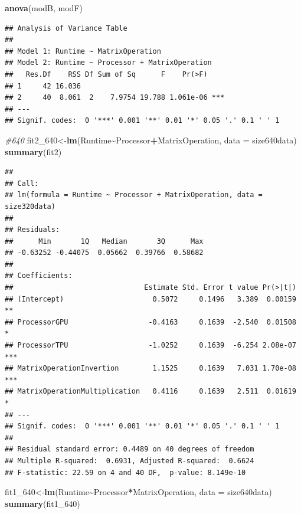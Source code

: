 \documentclass[
]{article}
\newenvironment{Shaded}{\begin{snugshade}}{\end{snugshade}}
\newcommand{\CommentTok}[1]{\textcolor[rgb]{0.56,0.35,0.01}{\textit{#1}}}
\newcommand{\DataTypeTok}[1]{\textcolor[rgb]{0.13,0.29,0.53}{#1}}
\newcommand{\DecValTok}[1]{\textcolor[rgb]{0.00,0.00,0.81}{#1}}
\newcommand{\KeywordTok}[1]{\textcolor[rgb]{0.13,0.29,0.53}{\textbf{#1}}}
\newcommand{\NormalTok}[1]{#1}
\newcommand{\OperatorTok}[1]{\textcolor[rgb]{0.81,0.36,0.00}{\textbf{#1}}}
\begin{document}
\begin{Shaded}
\begin{Highlighting}[]
\KeywordTok{anova}\NormalTok{(modB, modF)}
\end{Highlighting}
\end{Shaded}

\begin{verbatim}
## Analysis of Variance Table
## 
## Model 1: Runtime ~ MatrixOperation
## Model 2: Runtime ~ Processor + MatrixOperation
##   Res.Df    RSS Df Sum of Sq      F    Pr(>F)    
## 1     42 16.036                                  
## 2     40  8.061  2    7.9754 19.788 1.061e-06 ***
## ---
## Signif. codes:  0 '***' 0.001 '**' 0.01 '*' 0.05 '.' 0.1 ' ' 1
\end{verbatim}

\begin{Shaded}
\begin{Highlighting}[]
\CommentTok{\#640}
\NormalTok{fit2\_}\DecValTok{640}\NormalTok{\textless{}{-}}\KeywordTok{lm}\NormalTok{(Runtime}\OperatorTok{\textasciitilde{}}\NormalTok{Processor}\OperatorTok{+}\NormalTok{MatrixOperation, }\DataTypeTok{data =}\NormalTok{ size640data)}
\KeywordTok{summary}\NormalTok{(fit2)}
\end{Highlighting}
\end{Shaded}

\begin{verbatim}
## 
## Call:
## lm(formula = Runtime ~ Processor + MatrixOperation, data = size320data)
## 
## Residuals:
##      Min       1Q   Median       3Q      Max 
## -0.63252 -0.44075  0.05662  0.39766  0.58682 
## 
## Coefficients:
##                               Estimate Std. Error t value Pr(>|t|)    
## (Intercept)                     0.5072     0.1496   3.389  0.00159 ** 
## ProcessorGPU                   -0.4163     0.1639  -2.540  0.01508 *  
## ProcessorTPU                   -1.0252     0.1639  -6.254 2.08e-07 ***
## MatrixOperationInvertion        1.1525     0.1639   7.031 1.70e-08 ***
## MatrixOperationMultiplication   0.4116     0.1639   2.511  0.01619 *  
## ---
## Signif. codes:  0 '***' 0.001 '**' 0.01 '*' 0.05 '.' 0.1 ' ' 1
## 
## Residual standard error: 0.4489 on 40 degrees of freedom
## Multiple R-squared:  0.6931, Adjusted R-squared:  0.6624 
## F-statistic: 22.59 on 4 and 40 DF,  p-value: 8.149e-10
\end{verbatim}

\begin{Shaded}
\begin{Highlighting}[]
\NormalTok{fit1\_}\DecValTok{640}\NormalTok{\textless{}{-}}\KeywordTok{lm}\NormalTok{(Runtime}\OperatorTok{\textasciitilde{}}\NormalTok{Processor}\OperatorTok{*}\NormalTok{MatrixOperation, }\DataTypeTok{data =}\NormalTok{ size640data)}
\KeywordTok{summary}\NormalTok{(fit1\_}\DecValTok{640}\NormalTok{)}
\end{Highlighting}
\end{Shaded}
\end{document}
